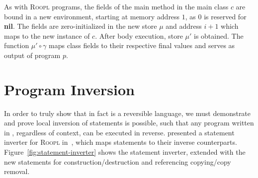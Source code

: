 As with \textsc{Roopl} programs, the fields of the main method in the main class $c$ are bound in a new environment, starting at memory address $1$, as $0$ is reserved for \textbf{nil}. The fields are zero-initialized in the new store $\mu$ and address $i + 1$ which maps to the new instance of $c$. After body execution, store $\mu'$ is obtained. The function $\mu' \circ \gamma$ maps class fields to their respective final values and serves as output of program $p$.


\section{Program Inversion}
\label{sec:program-inversion}
In order to truly show that \rooplpp in fact is a reversible language, we must demonstrate and prove local inversion of statements is possible, such that any program written in \rooplpp, regardless of context, can be executed in reverse. \citeauthor{th:roopl} presented a statement inverter for \textsc{Roopl} in~\cite{th:roopl}, which maps statements to their inverse counterparts. Figure~\ref{fig:statement-inverter} shows the statement inverter, extended with the new \rooplpp statements for construction/destruction and referencing copying/copy removal.

